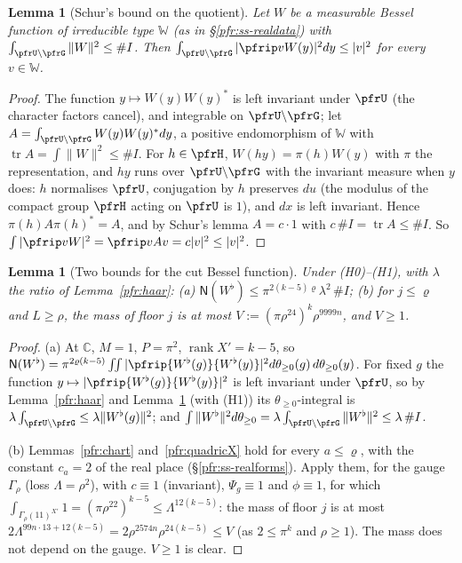 \documentclass[10pt]{amsart}
\newtheorem{lemma}[theorem]{Lemma}
\theoremstyle{definition}
\theoremstyle{remark}
\newcommand{\C}{\mathbb C}
\begin{document}
\begin{lemma}[Schur's bound on the quotient]\label{prp:schur}
Let $W$ be a measurable Bessel function of irreducible type $\mathbb W$ \textup{(}as in
\S\ref{pfr:ss-realdata}\textup{)} with $\int_{\pfrU\backslash\pfrG}\|W\|^2\le\#I$. Then
$\int_{\pfrU\backslash\pfrG}|\pfrip v{W(y)}|^2dy\le|v|^2$ for every $v\in\mathbb W$.
\end{lemma}
\begin{proof}
The function $y\mapsto W(y)W(y)^*$ is left invariant under $\pfrU$ (the character factors cancel), and
integrable on $\pfrU\backslash\pfrG$; let $A=\int_{\pfrU\backslash\pfrG}W(y)W(y)^*dy$, a positive endomorphism of
$\mathbb W$ with $\operatorname{tr}A=\int\|W\|^2\le\#I$. For $h\in\pfrH$, $W(hy)=\pi(h)W(y)$ with $\pi$ the
representation, and $hy$ runs over $\pfrU\backslash\pfrG$ with the invariant measure when $y$ does: $h$
normalises $\pfrU$, conjugation by $h$ preserves $du$ (the modulus of the compact group $\pfrH$ acting on
$\pfrU$ is $1$), and $dx$ is left invariant. Hence $\pi(h)A\pi(h)^*=A$, and by Schur's lemma $A=c\cdot1$ with
$c\,\#I=\operatorname{tr}A\le\#I$. So $\int|\pfrip v{W}|^2=\pfrip v{Av}=c|v|^2\le|v|^2$.
\end{proof}

\begin{lemma}[Two bounds for the cut Bessel function]\label{prp:normW}
Under \textup{(H0)}--\textup{(H1)}, with $\lambda$ the ratio of Lemma~\ref{pfr:haar}:
\textup{(a)} $\mathsf N(W^\flat)\le\pi^{2(k-5)\varrho}\lambda^2\,\#I$;
\textup{(b)} for $j\le\varrho$ and $L\ge\rho$, the mass of floor $j$ is at most
$V:=(\pi\rho^{24})^k\rho^{9999n}$, and $V\ge1$.
\end{lemma}
\begin{proof}
(a) At $\C$, $M=1$, $P=\pi^2$, $\operatorname{rank}X'=k-5$, so $\mathsf N(W^\flat)=\pi^{2\varrho(k-5)}\iint
|\pfrip{W^\flat(g)}{W^\flat(y)}|^2d\theta_{\ge0}(g)\,d\theta_{\ge0}(y)$. For fixed $g$ the function
$y\mapsto|\pfrip{W^\flat(g)}{W^\flat(y)}|^2$ is left invariant under $\pfrU$, so by Lemma~\ref{pfr:haar} and
Lemma~\ref{prp:schur} (with (H1)) its $\theta_{\ge0}$-integral is $\lambda\int_{\pfrU\backslash\pfrG}\le\lambda
\|W^\flat(g)\|^2$; and $\int\|W^\flat\|^2d\theta_{\ge0}=\lambda\int_{\pfrU\backslash\pfrG}\|W^\flat\|^2\le\lambda\,\#I$.

(b) Lemmas~\ref{pfr:chart} and~\ref{pfr:quadricX} hold for every $a\le\varrho$, with the constant $c_a=2$ of the
real place (\S\ref{pfr:ss-realforms}). Apply them, for the gauge $\Gamma_\rho$ (loss $\Lambda=\rho^2$), with $c\equiv1$
(invariant), $\Psi_g\equiv1$ and $\phi\equiv1$, for which $\int_{\Gamma_\rho(11)^{X'}}1=(\pi\rho^{22})^{k-5}\le
\Lambda^{12(k-5)}$: the mass of floor $j$ is at most $2\Lambda^{99n\cdot13+12(k-5)}=2\rho^{2574n}\rho^{24(k-5)}\le V$
(as $2\le\pi^k$ and $\rho\ge1$). The mass does not depend on the gauge. $V\ge1$ is clear.
\end{proof}
\end{document}
